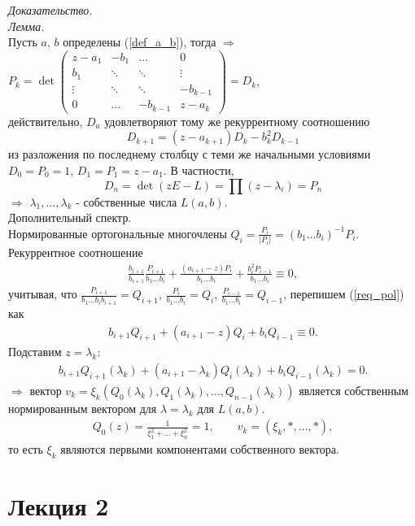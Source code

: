 \documentclass[a4paper,12pt]{article}
\theoremstyle{definition}
\theoremstyle{definition}
\theoremstyle{definition}
\newcommand{\bear}[1]{\begin{eqnarray}\label{#1}}
\newcommand{\ear}{\end{eqnarray}}
\begin{document}
\textit{Доказательство.}\\

\textit{Лемма.}\\
Пусть $a$, $b$ определены (\ref{def_a_b}), тогда $\Rightarrow$ $P_{k} = \det{\left( \begin{array}{cccc}
z - a_{1}& -b_{1} &\ldots & 0\\
b_{1}& \ddots &\ddots & \vdots\\
\vdots & \ddots &\ddots & -b_{k-1}\\
0& \ldots & -b_{k-1}  & z-a_{k}
\end{array}\right)} = D_{k}$, \\
действительно, $D_{a}$ удовлетворяют тому же рекуррентному соотношению
\[D_{k+1} = (z - a_{k+1})D_{k} - b^{2}_{k}D_{k-1}\]
из разложения по последнему столбцу с теми же начальными условиями $D_{0} = P_{0} = 1$, $D_{1} = P_{1} = z -a_{1}$.
В частности,
\[D_{n} = \det{\left(zE - L\right)} = \prod(z - \lambda_{i}) = P_{n}\]
$\Rightarrow$ $\lambda_{1},\ldots, \lambda_{k}$  - собственные числа $L(a,b)$.\\

Дополнительный спектр.\\

Нормированные ортогональные многочлены $Q_{i} = \displaystyle\frac{P_{i}}{|P_{i}|} = \left(b_{1}\ldots b_{i}\right)^{-1}P_{i}$.\\
Рекуррентное соотношение
\bear{req_pol}
\frac{b_{i+1}}{b_{i+1}}\frac{P_{i+1}}{b_{1}\ldots b_{i}} + \frac{(a_{i+1} -z)P_{i}}{b_{1}\ldots b_{i}} + \frac{b^{2}_{i}P_{i-1}}{b_{1}\ldots b_{i}} \equiv 0,
\ear
учитывая, что $\displaystyle\frac{P_{i+1}}{b_{1}\ldots b_{i}b_{i+1}} = Q_{i+1}$, $\displaystyle\frac{P_{i}}{b_{1}\ldots b_{i}} = Q_{i}$, $\displaystyle\frac{P_{i-1}}{b_{1}\ldots b_{i}} = Q_{i-1}$,
перепишем  (\ref{req_pol})  как
\bear{repol2}
b_{i+1}Q_{i+1} + \left(a_{i+1} -z\right)Q_{i} + b_{i}Q_{i-1} \equiv 0.
\ear
Подставим $z= \lambda_{k}$:
\bear{rec_pol3}
b_{i+1}Q_{i+1}(\lambda_{k}) + (a_{i+1} - \lambda_{k})Q_{i}(\lambda_{k}) + b_{i}Q_{i-1}(\lambda_{k}) = 0.
\ear
$\Rightarrow$ вектор $v_{k} = \xi_{k}\left(Q_{0}(\lambda_{k}),Q_{1}(\lambda_{k}),\ldots,Q_{n-1}(\lambda_{k})\right)$ является собственным нормированным вектором для
$\lambda = \lambda_{k}$ для $L(a,b)$.
\bear{Q0}
Q_{0}(z) =  \frac{1}{\xi^{2}_{1} + \ldots + \xi^{2}_{n}} =1, \qquad v_{k} = (\xi_{k},*,\ldots,*),
\ear
то есть $\xi_{k}$ являются первыми компонентами собственного вектора.

\section{Лекция 2}
\label{sec:-2}
\end{document}
